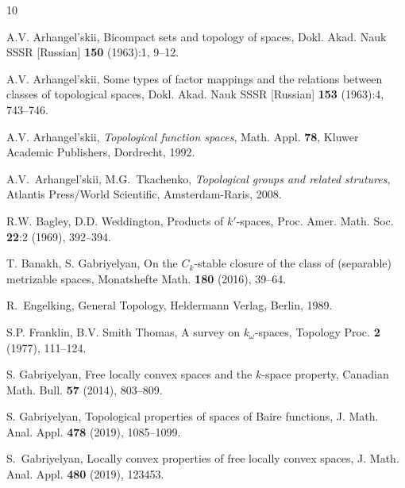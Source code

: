 \documentclass[preprint,11pt]{elsarticle}
\numberwithin{equation}{section}
\numberwithin{theorem}{section}
\newcommand{\w}{\omega}
\newcommand{\CC}{C_k}
\begin{document}

\begin{thebibliography}{10}



A.V. Arhangel'skii, Bicompact sets and topology of spaces, Dokl. Akad. Nauk SSSR [Russian] \textbf{150} (1963):1, 9--12.

A.V. Arhangel'skii, Some types of factor mappings and the relations between classes of topological spaces, Dokl. Akad. Nauk SSSR [Russian] \textbf{153} (1963):4, 743--746.


A.V. Arhangel'skii, \emph{Topological function spaces}, Math. Appl. \textbf{78}, Kluwer Academic Publishers, Dordrecht, 1992.

A.V.~Arhangel'skii, M.G.~Tkachenko, \emph{Topological groups and related strutures}, Atlantis Press/World Scientific, Amsterdam-Raris, 2008.

R.W. Bagley, D.D. Weddington, Products of $k'$-spaces, Proc. Amer. Math. Soc.  \textbf{22}:2 (1969), 392--394.

T. Banakh, S. Gabriyelyan,  On the $\CC$-stable closure of the class of (separable) metrizable spaces, Monatshefte Math.   \textbf{180} (2016), 39--64.

R.~Engelking, General Topology, Heldermann Verlag, Berlin, 1989.

S.P. Franklin, B.V. Smith Thomas, A survey on $k_\w$-spaces, Topology Proc. \textbf{2} (1977), 111--124.

S. Gabriyelyan, Free locally convex spaces and the  $k$-space property, Canadian Math. Bull. \textbf{57} (2014), 803--809.


S. Gabriyelyan, Topological properties of spaces of Baire functions, J. Math. Anal. Appl. \textbf{478} (2019), 1085--1099.


S.~Gabriyelyan, Locally convex properties of free locally convex spaces, J. Math. Anal. Appl. \textbf{480} (2019), 123453.


\end{thebibliography}
\end{document}
